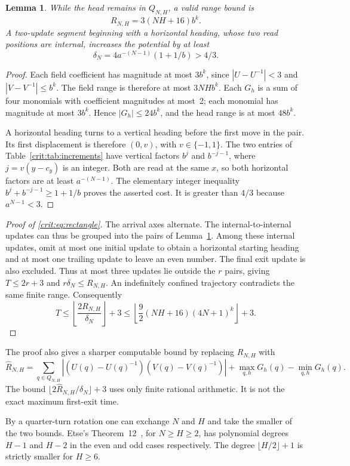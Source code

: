 \documentclass[11pt,a4paper]{article}
\newtheorem{lemma}[theorem]{Lemma}
\theoremstyle{remark}\newtheorem{remark}[theorem]{Remark}
\begin{document}
\begin{lemma}\label{crit:lem:rectangle}
While the head remains in $Q_{N,H}$, a valid range bound is
\[
 R_{N,H}=3(NH+16)b^k.
\]
A two-update segment beginning with a horizontal heading, whose two read
positions are internal, increases the potential by at least
\[
 \delta_N=4a^{-(N-1)}(1+1/b)>4/3.
\]
\end{lemma}
\begin{proof}
Each field coefficient has magnitude at most $3b^k$, since
$|U-U^{-1}|<3$ and $|V-V^{-1}|\le b^k$. The field range is therefore at most
$3NHb^k$. Each $G_h$ is a sum of four monomials with coefficient magnitudes at
most~2; each monomial has magnitude at most $3b^k$. Hence
$|G_h|\le24b^k$, and the head range is at most $48b^k$.

A horizontal heading turns to a vertical heading before the first move in
the pair. Its first displacement is therefore $(0,v)$, with $v\in\{-1,1\}$.
The two entries of Table~\ref{crit:tab:increments} have vertical factors
$b^j$ and $b^{-j-1}$, where $j=v(y-c_y)$ is an integer.
Both are read at the same $x$, so both horizontal factors are at least
$a^{-(N-1)}$. The elementary integer inequality
$b^j+b^{-j-1}\ge1+1/b$ proves the asserted cost. It is greater than $4/3$
because $a^{N-1}<3$.
\end{proof}

\begin{proof}[Proof of \eqref{crit:eq:rectangle}]
The arrival axes alternate. The internal-to-internal updates can thus be grouped
into the pairs of Lemma~\ref{crit:lem:rectangle}. Among these internal updates,
omit at most one initial update to obtain a horizontal starting heading and
at most one trailing update to leave an even number. The final exit update
is also excluded. Thus at most three updates lie outside the $r$ pairs, giving
$T\le2r+3$ and $r\delta_N\le R_{N,H}$.
An indefinitely confined trajectory contradicts the same finite range.
Consequently
\[
 T\le\left\lfloor\frac{2R_{N,H}}{\delta_N}\right\rfloor+3
 \le\left\lfloor\frac92(NH+16)(4N+1)^k\right\rfloor+3.
\]
\end{proof}

The proof also gives a sharper computable bound by replacing $R_{N,H}$ with
\[
 \widehat R_{N,H}=\sum_{q\in Q_{N,H}}|(U(q)-U(q)^{-1})(V(q)-V(q)^{-1})|
 +\max_{q,h}G_h(q)-\min_{q,h}G_h(q).
\]
The bound $\lfloor2\widehat R_{N,H}/\delta_N\rfloor+3$ uses only finite rational
arithmetic. It is not the exact maximum first-exit time.

By a quarter-turn rotation one can exchange $N$ and $H$ and take the
smaller of the two bounds. Etse's Theorem~12~\cite{Etse2026}, for $N\ge H\ge2$,
has polynomial degrees $H-1$ and $H-2$ in the even and odd cases respectively.
The degree $\lfloor H/2\rfloor+1$ is strictly smaller for $H\ge6$.
\end{document}
